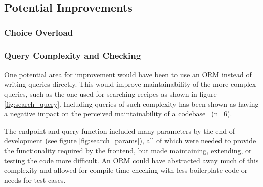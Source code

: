 \subsection{Potential Improvements}

\subsubsection{Choice Overload}\label{sec:choice_overload}

\subsubsection{Query Complexity and Checking}\label{sec:search_complexity}
One potential area for improvement would have been to use an ORM instead of
writing queries directly. This would improve maintainability of the more complex
queries, such as the one used for searching recipes as shown in figure \ref{fig:search_query}.
Including queries of such complexity has been shown as having a negative impact on the perceived
maintainability of a codebase~\cite{yamashita_code_2012} (n=6).

The endpoint and query function included many parameters by the end of development
(see figure \ref{fig:search_params}), all of which were needed to provide the functionality
required by the frontend, but made maintaining, extending, or testing the code more difficult.
An ORM could have abstracted away much of this complexity and allowed for compile-time checking
with less boilerplate code or needs for test cases.
